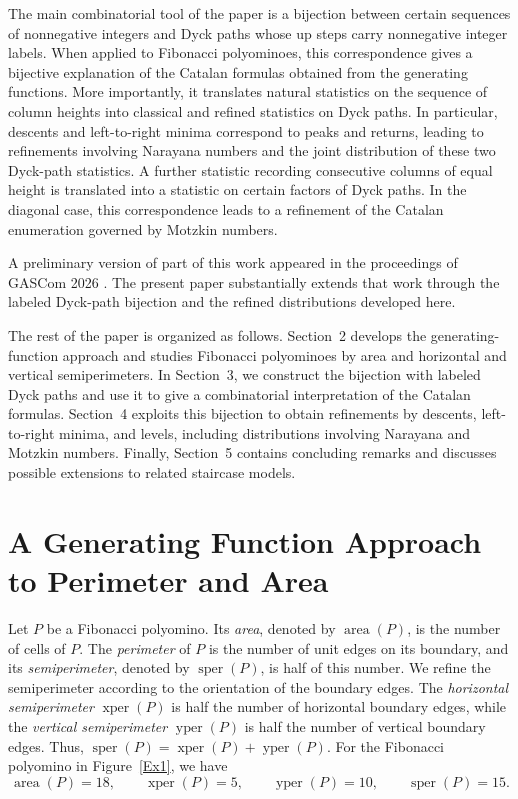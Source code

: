 \documentclass[12pt]{amsart}
\theoremstyle{plain}
\theoremstyle{definition}
\DeclareMathOperator{\yper}{yper}
\DeclareMathOperator{\xper}{xper}
\DeclareMathOperator{\sper}{sper}
\DeclareMathOperator{\area}{area}
\begin{document}
The main combinatorial tool of the paper is a bijection between certain sequences of nonnegative integers and Dyck paths whose up steps carry
nonnegative integer labels. When applied to Fibonacci polyominoes, this correspondence gives a bijective explanation of the Catalan formulas
obtained from the generating functions. More importantly, it translates natural statistics on the sequence of column heights into classical and
refined statistics on Dyck paths. In particular, descents and left-to-right minima correspond to peaks and returns, leading to refinements involving Narayana numbers and the joint distribution of these two Dyck-path statistics. A further statistic recording consecutive columns of equal height is translated into a statistic on
certain factors of Dyck paths. In the diagonal case, this correspondence leads to a refinement of the Catalan enumeration governed by Motzkin
numbers.

A preliminary version of part of this work appeared in the proceedings of GASCom 2026 \cite{BarilRamirezRamirezVillamizarGASCom}. The present paper substantially extends that work through the labeled Dyck-path bijection and the refined distributions developed here.

 
The rest of the paper is organized as follows. Section~2 develops the generating-function approach and studies Fibonacci polyominoes by area
and horizontal and vertical semiperimeters. In Section~3, we construct
the bijection with labeled Dyck paths and use it to give a combinatorial
interpretation of the Catalan formulas. Section~4 exploits this
bijection to obtain refinements by descents, left-to-right minima, and
levels, including distributions involving Narayana and Motzkin
numbers. Finally, Section~5 contains concluding remarks and discusses
possible extensions to related staircase models.


\section{A Generating Function Approach to Perimeter and Area}

Let $P$ be a Fibonacci polyomino. Its \emph{area}, denoted by $\area(P)$, is the  number of cells of $P$. The \emph{perimeter} of $P$ is the number of unit edges on its boundary, and its \emph{semiperimeter}, denoted by $\sper(P)$, is half of this number. We refine the semiperimeter according to the orientation of the boundary edges. The  \emph{horizontal semiperimeter} $\xper(P)$ is half the number of horizontal boundary edges, while the \emph{vertical semiperimeter} $\yper(P)$ is half the number of vertical boundary edges. Thus, $\sper(P)=\xper(P)+\yper(P)$. For the Fibonacci polyomino in Figure~\ref{Ex1}, we have \[
\area(P)=18,\qquad
\xper(P)=5,\qquad
\yper(P)=10,\qquad
\sper(P)=15.
\]
\end{document}
